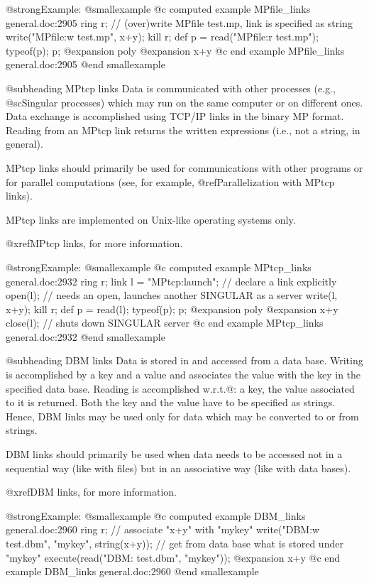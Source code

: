 {{{@strong{Example:}
@smallexample
@c computed example MPfile_links general.doc:2905 
  ring r;
  // (over)write MPfile test.mp, link is specified as string
  write("MPfile:w test.mp", x+y);
  kill r;
  def p = read("MPfile:r test.mp");
  typeof(p); p;
@expansion{} poly
@expansion{} x+y
@c end example MPfile_links general.doc:2905
@end smallexample

@subheading MPtcp links
Data is communicated with other processes (e.g., @sc{Singular}
processes) which may run on the same computer or on different ones.  Data
exchange is accomplished using TCP/IP links in the binary MP format.
Reading from an MPtcp link returns the written expressions (i.e., not a
string, in general).

MPtcp links should primarily be used for communications with other
programs or for parallel computations (see, for example,
@ref{Parallelization with MPtcp links}).

MPtcp links are implemented on Unix-like operating systems only.

@xref{MPtcp links}, for more information.

@strong{Example:}
@smallexample
@c computed example MPtcp_links general.doc:2932 
  ring r;
  link l = "MPtcp:launch"; // declare a link explicitly
  open(l);  // needs an open, launches another SINGULAR as a server
  write(l, x+y);
  kill r;
  def p = read(l);
  typeof(p); p;
@expansion{} poly
@expansion{} x+y
  close(l); // shuts down SINGULAR server
@c end example MPtcp_links general.doc:2932
@end smallexample

@subheading DBM links
Data is stored in and accessed from a data base.  Writing is
accomplished by a key and a value and associates the value with the key
in the specified data base.  Reading is accomplished w.r.t.@: a key,
the value associated to it is returned.  Both the key and the value have to
be specified as strings.  Hence, DBM links may be used only for data
which may be converted to or from strings.

DBM links should primarily be used when data needs to be accessed not in a
sequential way (like with files) but in an associative way (like with
data bases).

@xref{DBM links}, for more information.

@strong{Example:}
@smallexample
@c computed example DBM_links general.doc:2960 
  ring r;
  // associate "x+y" with "mykey"
  write("DBM:w test.dbm", "mykey", string(x+y));
  // get from data base what is stored under "mykey"
  execute(read("DBM: test.dbm", "mykey"));
@expansion{} x+y
@c end example DBM_links general.doc:2960
@end smallexample


}}}
